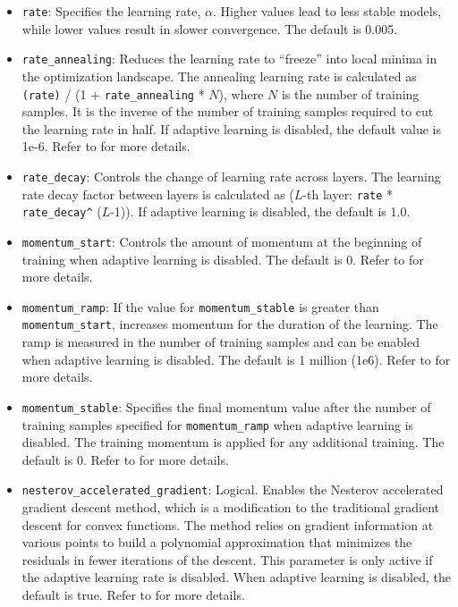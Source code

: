 {{\begin{itemize}
\item \texttt{rate}: Specifies the learning rate, $\alpha$. Higher values lead to less stable models, while lower values result in slower convergence. The default is 0.005.  %

\item \texttt{rate\_annealing}: Reduces the learning rate to ``freeze'' into local minima in the optimization landscape. The annealing learning rate is calculated as \texttt{(rate)} / (1 + \texttt{rate\_annealing} * $N$), where $N$ is the number of training samples.  It is the inverse of the number of training samples required to cut the learning rate in half.  If adaptive learning is disabled, the default value is 1e-6. Refer to {\textbf{}} for more details.

\item \texttt{rate\_decay}:  Controls the change of learning rate across layers. The learning rate decay factor between layers is calculated as ($L$-th layer: \texttt{rate} * \texttt{rate\_decay\^} ($L$-1)). If adaptive learning is disabled, the default is 1.0. 

\item \texttt{momentum\_start}: Controls the amount of momentum at the beginning of training when adaptive learning is disabled. The default is 0. Refer to {\textbf{}} for more details.

\item \texttt{momentum\_ramp}: If the value for \texttt{momentum\_stable} is greater than\\ \texttt{momentum\_start}, increases momentum for the duration of the learning.  The ramp is measured in the number of training samples and can be enabled when adaptive learning is disabled. The default is 1 million (1e6). Refer to {\textbf{}} for more details.

\item \texttt{momentum\_stable}: Specifies the final momentum value after the number of training samples specified for \texttt{momentum\_ramp} when adaptive learning is disabled. The training momentum is applied for any additional training. The default is 0.  Refer to {\textbf{}} for more details.

\item \texttt{nesterov\_accelerated\_gradient}:  Logical.  Enables the Nesterov accelerated gradient descent method, which is a modification to the traditional gradient descent for convex functions. The method relies on gradient information at various points to build a polynomial approximation that minimizes the residuals in fewer iterations of the descent. This parameter is only active if the adaptive learning rate is disabled.  When adaptive learning is disabled, the default is true. Refer to {\textbf{}} for more details.


\end{itemize}}}
